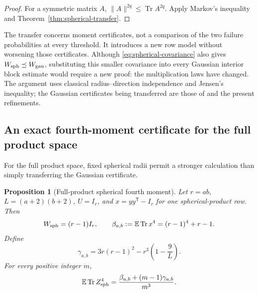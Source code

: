 \documentclass[11pt,a4paper]{article}
\newtheorem{proposition}[theorem]{Proposition}
\theoremstyle{definition}\newtheorem{definition}[theorem]{Definition}
\theoremstyle{remark}\newtheorem{remark}[theorem]{Remark}
\numberwithin{equation}{section}
\begin{document}
\begin{proof}
For a symmetric matrix $A$, $\|A\|^{2q}\le\operatorname{Tr}A^{2q}$.
Apply Markov's inequality and Theorem~\ref{thm:spherical-transfer}.
\end{proof}

The transfer concerns moment certificates, not a comparison of the two
failure probabilities at every threshold.  It introduces a new row model
without worsening those certificates.  Although
\eqref{eq:spherical-covariance} also gives $W_{\rm sph}\preceq W_{\rm gau}$,
substituting this smaller covariance into every Gaussian interior block
estimate would require a new proof: the multiplication laws have changed.
The argument uses classical radius--direction independence and Jensen's
inequality; the Gaussian certificates being transferred are those of
\cite{KRSource} and the present refinements.

\subsection{An exact fourth-moment certificate for the full product space}

For the full product space, fixed spherical radii permit a stronger
calculation than simply transferring the Gaussian certificate.

\begin{proposition}[Full-product spherical fourth moment]
\label{prop:spherical-fourth}
Let $r=ab$, $L=(a+2)(b+2)$, $U=I_r$, and
$x=yy^{\mathsf T}-I_r$ for one spherical-product row.  Then
\[
 W_{\rm sph}=(r-1)I_r,\qquad
 \beta_{a,b}:=\mathbb E\operatorname{Tr}x^4=(r-1)^4+r-1.
\]
Define
\[
 \gamma_{a,b}
 =3r(r-1)^2-r^3\left(1-\frac9L\right).
\]
For every positive integer $m$,
\begin{equation}\label{eq:spherical-exact-fourth}
 \mathbb E\operatorname{Tr}Z_{\rm sph}^4
 =\frac{\beta_{a,b}+(m-1)\gamma_{a,b}}{m^3}.
\end{equation}
\end{proposition}
\end{document}
